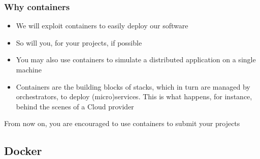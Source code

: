 \documentclass[presentation]{beamer}\mode<presentation>{\usetheme{AMSBolognaFC}}
\begin{document}
\begin{frame}
\frametitle{Why containers}

    \begin{itemize}
        \item We will exploit containers to easily deploy our software

        \item So will you, for your projects, if possible

        \item You may also use containers to simulate a distributed application on a single machine

        \item Containers are the building blocks of \alert{stacks}, which in turn are managed by \alert{orchestrators}, to deploy (\alert{micro})\alert{services}.
        This is what happens, for instance, behind the scenes of a \alert{Cloud} provider

    \end{itemize}

    \bigskip

    \begin{block}{}
        \alert{From now on}, you are \alert{encouraged} to use containers to submit your projects
    \end{block}

\end{frame}

\subsection{Docker}
\end{document}
